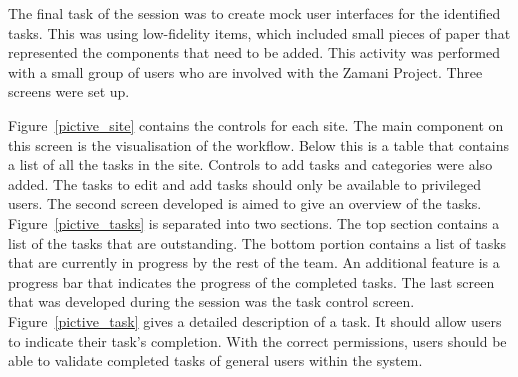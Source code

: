 The final task of the session was to create mock user interfaces for the
identified tasks. This was using low-fidelity items, which included small pieces
of paper that represented the components that need to be added. This activity
was performed with a small group of users who are involved with the Zamani Project.
Three screens were set up.

Figure~\ref{pictive_site} contains the controls for each site. The main component
on this screen is the visualisation of the workflow. Below this is a table that
contains a list of all the tasks in the site. Controls to add tasks and categories
were also added. The tasks to edit and add tasks should only be available to privileged
users. The second screen developed is aimed to give an overview of
the tasks. Figure~\ref{pictive_tasks} is separated into two sections. The top
section contains a list of the tasks that are outstanding. The bottom  portion
contains a list of tasks that are currently in progress by the rest of the team.
An additional feature is a progress bar that indicates the progress of the
completed tasks. The last screen that was developed during the session was the task control
screen. Figure~\ref{pictive_task} gives a detailed description of a task. It should
allow users to indicate their task's completion. With the correct permissions,
users should be able to validate completed tasks of general users within the
system.

